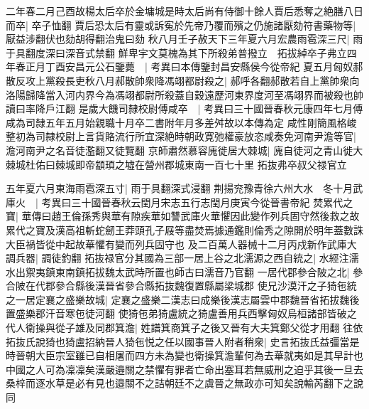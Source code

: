 二年春二月己酉故楊太后卒於金墉城是時太后尚有侍御十餘人賈后悉奪之絶膳八日而卒|{
	卒子恤翻}
賈后恐太后有靈或訴寃於先帝乃覆而殯之仍施諸厭劾符書藥物等|{
	厭益涉翻伏也劾胡得翻治鬼曰劾}
秋八月壬子赦天下三年夏六月宏農雨雹深三尺|{
	雨于具翻度深曰深音式禁翻}
鮮卑宇文莫槐為其下所殺弟普撥立　拓拔綽卒子弗立四年春正月丁酉安昌元公石鑒薨　|{
	考異曰本傳鑒封昌安縣侯今從帝紀}
夏五月匈奴郝散反攻上黨殺長吏秋八月郝散帥衆降馮翊都尉殺之|{
	郝呼各翻郝散若自上黨帥衆向洛陽歸降當入河内界今為馮翊都尉所殺蓋自穀遠歷河東界度河至馮翊界而被殺也帥讀曰率降戶江翻}
是歲大饑司隸校尉傅咸卒　|{
	考異曰三十國晉春秋元康四年七月傅咸為司隸五年五月始親職十月卒二書附年月多差舛故以本傳為定}
咸性剛簡風格峻整初為司隸校尉上言貨賂流行所宜深絶時朝政寛弛權豪放恣咸奏免河南尹澹等官|{
	澹河南尹之名音徒濫翻又徒覽翻}
京師肅然慕容廆徙居大棘城|{
	廆自徒河之青山徙大棘城杜佑曰棘城即帝顓頊之墟在營州郡城東南一百七十里}
拓抜弗卒叔父禄官立

五年夏六月東海雨雹深五寸|{
	雨于具翻深式浸翻}
荆揚兖豫青徐六州大水　冬十月武庫火　|{
	考異曰三十國晉春秋云閏月宋志五行志閏月庚寅今從晉書帝紀}
焚累代之寶|{
	華傳曰趙王倫孫秀與華有隙疾華如讐武庫火華懼因此變作列兵固守然後救之故累代之寶及漢高祖斬蛇劒王莽頭孔子屐等盡焚焉據通鑑則倫秀之隙開於明年蓋數誅大臣禍皆從中起故華懼有變而列兵固守也}
及二百萬人器械十二月丙戍新作武庫大調兵器|{
	調徒釣翻}
拓抜禄官分其國為三部一居上谷之北濡源之西自統之|{
	水經注濡水出禦夷鎮東南鎮拓拔魏太武時所置也師古曰濡音乃官翻}
一居代郡參合陂之北|{
	參合陂在代郡參合縣後漢晉省參合縣拓抜魏復置縣屬梁城郡}
使兄沙漠汗之子猗㐌統之一居定襄之盛樂故城|{
	定襄之盛樂二漢志曰成樂後漢志屬雲中郡魏晉省拓拔魏後置盛樂郡汗音寒㐌徒河翻}
使猗㐌弟猗盧統之猗盧善用兵西擊匈奴烏桓諸部皆破之代人衛操與從子雄及同郡箕澹|{
	姓譜箕商箕子之後又晉有大夫箕鄭父從才用翻}
往依拓抜氏說猗也猗盧招納晉人猗㐌悦之任以國事晉人附者稍衆|{
	史言拓抜氏益彊當是時晉朝大臣宗室雖已自相屠而四方未為變也衛操箕澹輩何為去華就夷如是其早計也中國之人可為凜凜矣漢嚴邉關之禁懼有罪者亡命出塞耳若無威刑之迫乎其後一旦去桑梓而逐水草是必有見也邉關不之詰朝廷不之虞晉之無政亦可知矣說輸芮翻下之說同}


